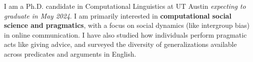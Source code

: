 I am a Ph.D. candidate in Computational Linguistics at UT Austin \emph{expecting to graduate in May 2024}. I am primarily interested in \textbf{computational social science and pragmatics}, with a focus on social dynamics (like intergroup bias) in online communication. I have also studied how individuals perform pragmatic acts like giving advice, and surveyed the diversity of generalizations available across predicates and arguments in English.
